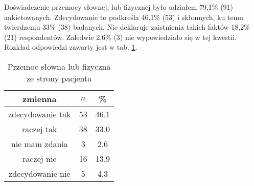 
Doświadczenie przemocy słownej, lub fizycznej było udziałem 79,1\% (91) ankietowanych. Zdecydowanie to podkreśla 46,1\% (53) i skłonnych, ku temu twierdzeniu 33\% (38) badanych. Nie deklaruje zaistnienia takich faktów 18,2\% (21) respondentów. Zaledwie 2,6\% (3) nie wypowiedziało się w tej kwestii. Rozkład odpowiedzi zawarty jest w tab. \ref{tab:Q16}. 

\begin{table}[H]
\caption{Przemoc słowna lub fizyczna ze strony pacjenta}
\centering
\begin{tabular}{ | c | c | c |}
\hline
zmienna & $n$ & \% \\
\hline
zdecydowanie tak  &  53  & 46.1 \\
\hline
raczej tak  &  38  & 33.0 \\
\hline
nie mam zdania  &  3  & 2.6\\
\hline
raczej nie  &  16  & 13.9 \\
\hline
zdecydowanie nie  &  5  & 4.3 \\
\hline
\end{tabular}
\label{tab:Q16}
\end{table}
